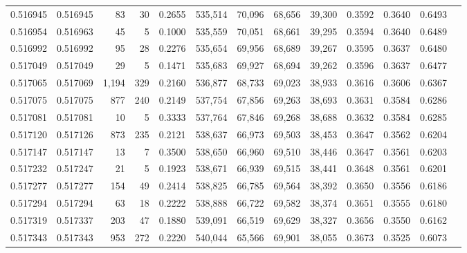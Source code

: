 \begin{tabular}{rrrrrrrrrrrrr}
0.516945 & 0.516945 &    83 &    30 &                                     0.2655 & 535,514 &  70,096 &  68,656 &  39,300 & 0.3592 & 0.3640 & 0.6493 \\
0.516954 & 0.516963 &    45 &     5 &                                     0.1000 & 535,559 &  70,051 &  68,661 &  39,295 & 0.3594 & 0.3640 & 0.6489 \\
0.516992 & 0.516992 &    95 &    28 &                                     0.2276 & 535,654 &  69,956 &  68,689 &  39,267 & 0.3595 & 0.3637 & 0.6480 \\
0.517049 & 0.517049 &    29 &     5 &                                     0.1471 & 535,683 &  69,927 &  68,694 &  39,262 & 0.3596 & 0.3637 & 0.6477 \\
0.517065 & 0.517069 & 1,194 &   329 &                                     0.2160 & 536,877 &  68,733 &  69,023 &  38,933 & 0.3616 & 0.3606 & 0.6367 \\
0.517075 & 0.517075 &   877 &   240 &                                     0.2149 & 537,754 &  67,856 &  69,263 &  38,693 & 0.3631 & 0.3584 & 0.6286 \\
0.517081 & 0.517081 &    10 &     5 &                                     0.3333 & 537,764 &  67,846 &  69,268 &  38,688 & 0.3632 & 0.3584 & 0.6285 \\
0.517120 & 0.517126 &   873 &   235 &                                     0.2121 & 538,637 &  66,973 &  69,503 &  38,453 & 0.3647 & 0.3562 & 0.6204 \\
0.517147 & 0.517147 &    13 &     7 &                                     0.3500 & 538,650 &  66,960 &  69,510 &  38,446 & 0.3647 & 0.3561 & 0.6203 \\
0.517232 & 0.517247 &    21 &     5 &                                     0.1923 & 538,671 &  66,939 &  69,515 &  38,441 & 0.3648 & 0.3561 & 0.6201 \\
0.517277 & 0.517277 &   154 &    49 &                                     0.2414 & 538,825 &  66,785 &  69,564 &  38,392 & 0.3650 & 0.3556 & 0.6186 \\
0.517294 & 0.517294 &    63 &    18 &                                     0.2222 & 538,888 &  66,722 &  69,582 &  38,374 & 0.3651 & 0.3555 & 0.6180 \\
0.517319 & 0.517337 &   203 &    47 &                                     0.1880 & 539,091 &  66,519 &  69,629 &  38,327 & 0.3656 & 0.3550 & 0.6162 \\
0.517343 & 0.517343 &   953 &   272 &                                     0.2220 & 540,044 &  65,566 &  69,901 &  38,055 & 0.3673 & 0.3525 & 0.6073 \\

\end{tabular}
